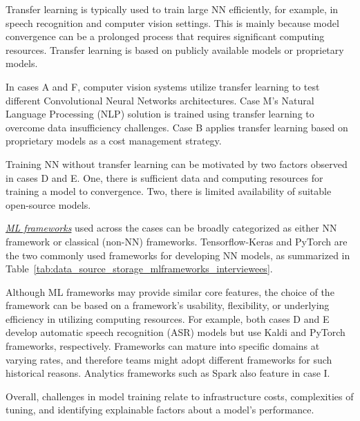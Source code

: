 \documentclass{IEEEcsmag}
\begin{document}
Transfer learning is typically used to train large NN efficiently, for example, in speech recognition and computer vision settings. This is mainly because model convergence can be a prolonged process that requires significant computing resources. Transfer learning is based on publicly available models or proprietary models.

In cases A and F, computer vision systems utilize transfer learning to test different Convolutional Neural Networks architectures. Case M's Natural Language Processing (NLP) solution is trained using transfer learning to overcome data insufficiency challenges. Case B applies transfer learning based on proprietary models as a cost management strategy. 

Training NN without transfer learning can be motivated by two factors observed in cases D and E. One, there is sufficient data and computing resources for training a model to convergence. Two, there is limited availability of suitable open-source models.

\underline{\emph{ML frameworks}}
used across the cases can be broadly categorized as either NN framework or classical (non-NN) frameworks. Tensorflow-Keras and PyTorch are the two commonly used frameworks for developing NN models, as summarized in  Table~\ref{tab:data_source_storage_mlframeworks_interviewees}.

Although ML frameworks may provide similar core features, the choice of the framework can be based on a framework's usability, flexibility, or underlying efficiency in utilizing computing resources. For example, both cases D and E develop automatic speech recognition (ASR) models but use Kaldi and PyTorch frameworks, respectively. 
Frameworks can mature into specific domains at varying rates, and therefore teams might adopt different frameworks for such historical reasons. Analytics frameworks such as Spark also feature in case I. 

Overall, challenges in model training relate to infrastructure costs, complexities of tuning, and identifying explainable factors about a model's performance.
\end{document}
